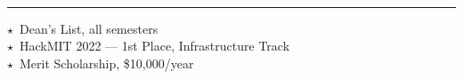 \documentclass[10pt, a4paper]{article}
\begin{document}
\begin{minipage}[t]{0.67\textwidth}
\vspace{10pt}
\\[-4pt]
\hspace{12pt}\rule{0.9\textwidth}{0.3pt}

\vspace{4pt}
\hspace{12pt}
{\footnotesize
$\star$\ Dean's List, all semesters\\
\hspace{12pt}$\star$\ HackMIT 2022 — 1st Place, Infrastructure Track\\
\hspace{12pt}$\star$\ Merit Scholarship, \$10,000/year
}

\end{minipage}
\end{document}
